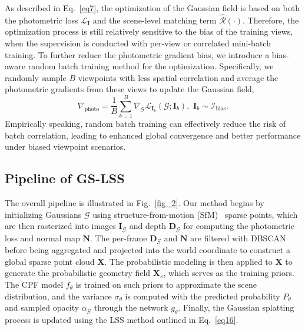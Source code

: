 \documentclass[lettersize,journal]{IEEEtran}
\begin{document}
As described in Eq.~\ref{eq7}, the optimization of the Gaussian field is based on both the photometric loss $\mathcal{L}_{\mathbf{I}}$ and the scene-level matching term $\widehat{\mathcal{R}}(\cdot)$. Therefore, the optimization process is still relatively sensitive to the bias of the training views, when the supervision is conducted with per-view or correlated mini-batch training. 
To further reduce the photometric gradient bias, we introduce a bias-aware random batch training method for the optimization. Specifically, we randomly sample $B$ viewpoints with less spatial correlation and average the photometric gradients from these views to update the Gaussian field, 
\begin{equation}
    \nabla_{\text{photo}} = \frac{1}{B} \sum_{b=1}^{B} \nabla_{\mathcal{G}} \mathcal{L}_{\mathbf{I}_b} \left( \mathcal{G}; \mathbf{I}_b \right),\,\, \mathbf{I}_b \sim \mathcal{I}_{\text{bias}}.
    \label{eq26}
\end{equation}
Empirically speaking, random batch training can effectively reduce the risk of batch correlation, leading to enhanced global convergence and better performance under biased viewpoint scenarios. 



\subsection{Pipeline of GS-LSS}

The overall pipeline is illustrated in Fig.~\ref{fig_2}. Our method begins by initializing Gaussians $\mathcal{G}$ using structure-from-motion (SfM)~\cite{sfm} sparse points, which are then rasterized into images $\mathbf{I}_{\mathcal{G}}$ and depth $\mathbf{D}_{\mathcal{G}}$ for computing the photometric loss and normal map $\mathbf{N}$. The per-frame $\mathbf{D}_{\mathcal{G}}$ and $\mathbf{N}$ are filtered with DBSCAN before being aggregated and projected into the world coordinate to construct a global sparse point cloud $\mathbf{X}$. The probabilistic modeling is then applied to $\mathbf{X}$ to generate the probabilistic geometry field $\mathbf{X}_{s}$, which serves as the training priors. The CPF model $f_{\theta}$ is trained on such priors to approximate the scene distribution, and the variance $\sigma_{\theta}$ is computed with the predicted probability $P_{\theta}$ and sampled opacity $\alpha_{\mathcal{G}}$ through the network $g_{\theta}$. Finally, the Gaussian splatting process is updated using the LSS method outlined in Eq.~\ref{eq16}. 
\end{document}

